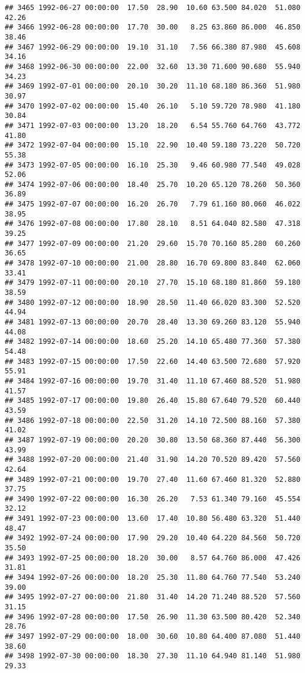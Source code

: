 \documentclass{article}\usepackage{graphicx, color}
\makeatletter
\newenvironment{kframe}{%
 \def\at@end@of@kframe{}%
 \ifinner\ifhmode%
  \def\at@end@of@kframe{\end{minipage}}%
  \begin{minipage}{\columnwidth}%
 \fi\fi%
 \def\FrameCommand##1{\hskip\@totalleftmargin \hskip-\fboxsep
 \colorbox{shadecolor}{##1}\hskip-\fboxsep
     \hskip-\linewidth \hskip-\@totalleftmargin \hskip\columnwidth}%
 \MakeFramed {\advance\hsize-\width
   \@totalleftmargin\z@ \linewidth\hsize
   \@setminipage}}%
 {\par\unskip\endMakeFramed%
 \at@end@of@kframe}
\newenvironment{knitrout}{}{} %
\makeatother
\begin{document}
\begin{knitrout}
\begin{kframe}
\begin{verbatim}
## 3465 1992-06-27 00:00:00  17.50  28.90  10.60 63.500 84.020  51.080  42.26
## 3466 1992-06-28 00:00:00  17.70  30.00   8.25 63.860 86.000  46.850  38.46
## 3467 1992-06-29 00:00:00  19.10  31.10   7.56 66.380 87.980  45.608  34.16
## 3468 1992-06-30 00:00:00  22.00  32.60  13.30 71.600 90.680  55.940  34.23
## 3469 1992-07-01 00:00:00  20.10  30.20  11.10 68.180 86.360  51.980  30.97
## 3470 1992-07-02 00:00:00  15.40  26.10   5.10 59.720 78.980  41.180  30.84
## 3471 1992-07-03 00:00:00  13.20  18.20   6.54 55.760 64.760  43.772  41.80
## 3472 1992-07-04 00:00:00  15.10  22.90  10.40 59.180 73.220  50.720  55.38
## 3473 1992-07-05 00:00:00  16.10  25.30   9.46 60.980 77.540  49.028  52.06
## 3474 1992-07-06 00:00:00  18.40  25.70  10.20 65.120 78.260  50.360  36.89
## 3475 1992-07-07 00:00:00  16.20  26.70   7.79 61.160 80.060  46.022  38.95
## 3476 1992-07-08 00:00:00  17.80  28.10   8.51 64.040 82.580  47.318  39.25
## 3477 1992-07-09 00:00:00  21.20  29.60  15.70 70.160 85.280  60.260  36.65
## 3478 1992-07-10 00:00:00  21.00  28.80  16.70 69.800 83.840  62.060  33.41
## 3479 1992-07-11 00:00:00  20.10  27.70  15.10 68.180 81.860  59.180  38.59
## 3480 1992-07-12 00:00:00  18.90  28.50  11.40 66.020 83.300  52.520  44.94
## 3481 1992-07-13 00:00:00  20.70  28.40  13.30 69.260 83.120  55.940  44.08
## 3482 1992-07-14 00:00:00  18.60  25.20  14.10 65.480 77.360  57.380  54.48
## 3483 1992-07-15 00:00:00  17.50  22.60  14.40 63.500 72.680  57.920  55.91
## 3484 1992-07-16 00:00:00  19.70  31.40  11.10 67.460 88.520  51.980  41.57
## 3485 1992-07-17 00:00:00  19.80  26.40  15.80 67.640 79.520  60.440  43.59
## 3486 1992-07-18 00:00:00  22.50  31.20  14.10 72.500 88.160  57.380  41.02
## 3487 1992-07-19 00:00:00  20.20  30.80  13.50 68.360 87.440  56.300  43.99
## 3488 1992-07-20 00:00:00  21.40  31.90  14.20 70.520 89.420  57.560  42.64
## 3489 1992-07-21 00:00:00  19.70  27.40  11.60 67.460 81.320  52.880  37.75
## 3490 1992-07-22 00:00:00  16.30  26.20   7.53 61.340 79.160  45.554  32.12
## 3491 1992-07-23 00:00:00  13.60  17.40  10.80 56.480 63.320  51.440  48.47
## 3492 1992-07-24 00:00:00  17.90  29.20  10.40 64.220 84.560  50.720  35.50
## 3493 1992-07-25 00:00:00  18.20  30.00   8.57 64.760 86.000  47.426  31.81
## 3494 1992-07-26 00:00:00  18.20  25.30  11.80 64.760 77.540  53.240  39.00
## 3495 1992-07-27 00:00:00  21.80  31.40  14.20 71.240 88.520  57.560  31.15
## 3496 1992-07-28 00:00:00  17.50  26.90  11.30 63.500 80.420  52.340  28.76
## 3497 1992-07-29 00:00:00  18.00  30.60  10.80 64.400 87.080  51.440  38.60
## 3498 1992-07-30 00:00:00  18.30  27.30  11.10 64.940 81.140  51.980  29.33

\end{verbatim}
\end{kframe}
\end{knitrout}
\end{document}
